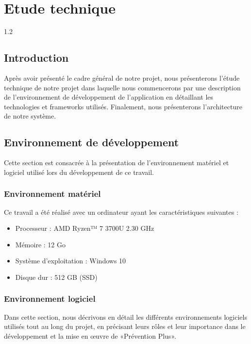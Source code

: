\chapter{Etude technique}
\usetikzlibrary{positioning} 
\usetikzlibrary{calc} 
\begin{spacing}{1.2}
\minitoc
\thispagestyle{MyStyle}
\end{spacing}
\newpage
 
\section*{Introduction}
\noindent Après avoir présenté le cadre général de notre projet, nous présenterons l'étude technique de notre projet dans laquelle nous commencerons par une description de l'environnement de développement de l'application en détaillant les technologies et frameworks utilisés. Finalement, nous présenterons l'architecture de notre système.

\section{Environnement de développement}

\noindent Cette section est consacrée à la présentation de l'environnement matériel et logiciel utilisé lors du développement de ce travail.

\subsection{Environnement matériel}

\noindent Ce travail a été réalisé avec un ordinateur ayant les caractéristiques suivantes :
\begin{itemize}
    \item Processeur : AMD Ryzen™ 7 3700U 2.30 GHz
    \item Mémoire : 12 Go
    \item Système d'exploitation : Windows 10
    \item Disque dur : 512 GB (SSD)
\end{itemize}

\subsection{Environnement logiciel}

\noindent Dans cette section, nous décrivons en détail les différents environnements logiciels utilisés tout au long du projet, en précisant leurs rôles et leur importance dans le développement et la mise en œuvre de «Prévention Plus».
